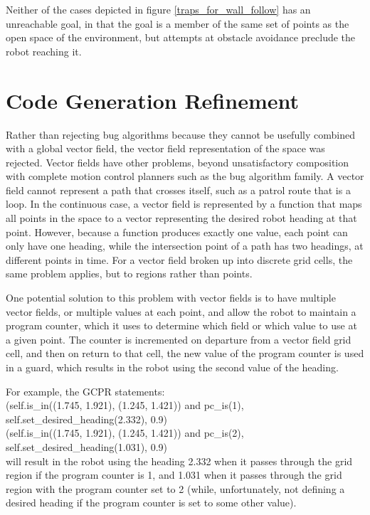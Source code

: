 Neither of the cases depicted in figure \ref{traps_for_wall_follow} has an unreachable goal, in that the goal is a member of the same set of points as the open space of the environment, but attempts at obstacle avoidance preclude the robot reaching it. 

\section{Code Generation Refinement}

Rather than rejecting bug algorithms because they cannot be usefully combined with a global vector field, the vector field representation of the space was rejected. 
Vector fields have other problems, beyond unsatisfactory composition with complete motion control planners such as the bug algorithm family. 
A vector field cannot represent a path that crosses itself, such as a patrol route that is a loop.
In the continuous case, a vector field is represented by a function that maps all points in the space to a vector representing the desired robot heading at that point. 
However, because a function produces exactly one value, each point can only have one heading, while the intersection point of a path has two headings, at different points in time. 
For a vector field broken up into discrete grid cells, the same problem applies, but to regions rather than points. 

One potential solution to this problem with vector fields is to have multiple vector fields, or multiple values at each point, and allow the robot to maintain a program counter, which it uses to determine which field or which value to use at a given point. 
The counter is incremented on departure from a vector field grid cell, and then on return to that cell, the new value of the program counter is used in a guard, which results in the robot using the second value of the heading. 

For example, the GCPR statements:\\
(self.is\_in((1.745, 1.921), (1.245, 1.421)) and pc\_is(1), self.set\_desired\_heading(2.332), 0.9)\\
(self.is\_in((1.745, 1.921), (1.245, 1.421)) and pc\_is(2), self.set\_desired\_heading(1.031), 0.9)\\
will result in the robot using the heading 2.332 when it passes through the grid region if the program counter is 1, and 1.031 when it passes through the grid region with the program counter set to 2 (while, unfortunately, not defining a desired heading if the program counter is set to some other value).

